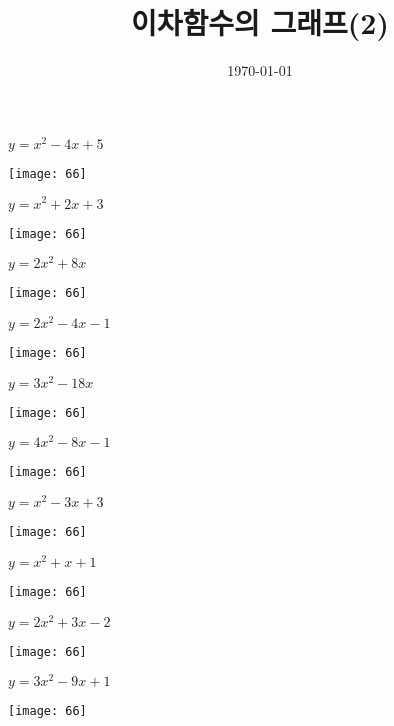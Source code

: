 \documentclass[a4paper]{oblivoir}
\title{이차함수의 그래프(2)}
\date{\today}
\author{}
\begin{document}
\maketitle

\begin{minipage}{0.45\textwidth}\centering
\(y=x^2-4x+5\)
\par\bigskip\texttt{[image: 66]}
\end{minipage}
\begin{minipage}{0.45\textwidth}\centering
\(y=x^2+2x+3\)
\par\bigskip\texttt{[image: 66]}
\end{minipage}\bigskip\bigskip\par
\begin{minipage}{0.45\textwidth}\centering
\(y=2x^2+8x\)
\par\bigskip\texttt{[image: 66]}
\end{minipage}
\begin{minipage}{0.45\textwidth}\centering
\(y=2x^2-4x-1\)
\par\bigskip\texttt{[image: 66]}
\end{minipage}\bigskip\bigskip\par

\clearpage
\begin{minipage}{0.45\textwidth}\centering
\(y=3x^2-18x\)
\par\bigskip\texttt{[image: 66]}
\end{minipage}
\begin{minipage}{0.45\textwidth}\centering
\(y=4x^2-8x-1\)
\par\bigskip\texttt{[image: 66]}
\end{minipage}\bigskip\bigskip\par
\begin{minipage}{0.45\textwidth}\centering
\(y=x^2-3x+3\)
\par\bigskip\texttt{[image: 66]}
\end{minipage}
\begin{minipage}{0.45\textwidth}\centering
\(y=x^2+x+1\)
\par\bigskip\texttt{[image: 66]}
\end{minipage}\bigskip\bigskip\par
\begin{minipage}{0.45\textwidth}\centering
\(y=2x^2+3x-2\)
\par\bigskip\texttt{[image: 66]}
\end{minipage}
\begin{minipage}{0.45\textwidth}\centering
\(y=3x^2-9x+1\)
\par\bigskip\texttt{[image: 66]}
\end{minipage}\bigskip\bigskip\par
\end{document}
